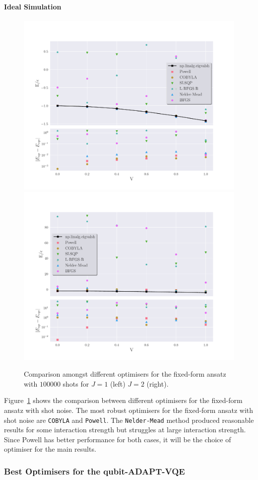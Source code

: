 \paragraph{Ideal Simulation}
\begin{figure}[ht]
	\centering
	\includegraphics[width=0.45\linewidth]{image/lipkin_result/vqe-opt/cmp_opt_vqe_p_ee100000_J=1.pdf}
	\includegraphics[width=0.45\linewidth]{image/lipkin_result/vqe-opt/cmp_opt_vqe_p_ee100000_J=2.pdf}
	\caption{Comparison amongst different optimisers for the fixed-form ansatz with $ 100000 $ shots for $ J=1$ (left) $J=2 $ (right).}
	\label{fig:Opt-fixed-form-noisy}
\end{figure}

Figure~\ref{fig:Opt-fixed-form-noisy} shows the comparison between different optimisers for the fixed-form ansatz with shot noise. The most robust optimisers for the fixed-form ansatz with shot noise are \texttt{COBYLA} and \texttt{Powell}. The \texttt{Nelder-Mead} method produced reasonable results for some interaction strength but struggles at large interaction strength. Since Powell has better performance for both cases, it will be the choice of optimiser for the main results.

\subsubsection{Best Optimisers for the qubit-ADAPT-VQE}%
\label{ssub:BestOptimisersforADAPT}

